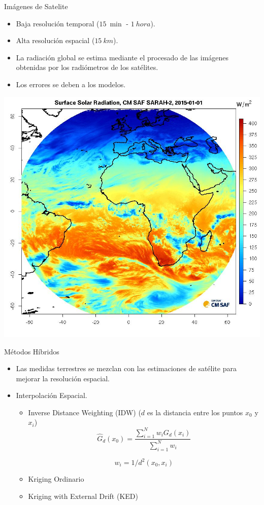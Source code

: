 \documentclass[xcolor={usenames,svgnames,dvipsnames}]{beamer}
\begin{document}
\begin{frame}[label={sec:orga9a0a7e}]{Imágenes de Satelite}
\begin{itemize}
\item Baja resolución temporal (\(\SI{15}{\min}\) - \(\SI{1}{hora}\)).

\item Alta resolución espacial (\(\SI{15}{km}\)).

\item La radiación global se estima mediante el procesado de las imágenes obtenidas por los radiómetros de los satélites.

\item Los errores se deben a los modelos.
\end{itemize}

\begin{center}
\includegraphics[height=0.5\textheight]{../figs/CMSAF.png}
\end{center}
\end{frame}

\begin{frame}[label={sec:org40e8cd2}]{Métodos Híbridos}
\begin{itemize}
\item Las medidas terrestres se mezclan con las estimaciones de satélite para mejorar la resolución espacial.
\item Interpolación Espacial.
\begin{itemize}
\item \alert{Inverse Distance Weighting (IDW)} (\(d\) es la distancia entre los puntos \(x_0\) y  \(x_i\))
\[
\widehat{G}_d(x_0) = \frac{\sum_{i=1}^N w_i G_{d}(x_i)}{\sum_{i=1}^N w_i} 
\]

\[
  w_i = 1/d^2(x_0, x_i)
\]
\item \alert{Kriging Ordinario}
\item \alert{Kriging with External Drift (KED)}
\end{itemize}
\end{itemize}
\end{frame}
\end{document}
